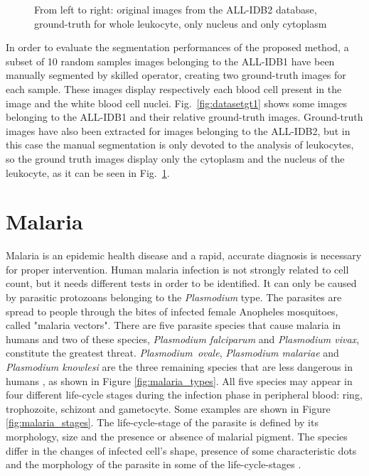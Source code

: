 \documentclass[final,a4paper,12pt,english]{UnicaPhdThesis3}
\begin{document}
	\begin{figure}[!htbp]
		\centering
		\hspace{12.5mm}
		\caption{\label{fig:datasetgt2}From left to right: original images from the ALL-IDB2 database, ground-truth for whole leukocyte, only nucleus and only cytoplasm}
	\end{figure}
	
	In order to evaluate the segmentation performances of the proposed method, a subset of 10 random samples images belonging to the ALL-IDB1 have been manually segmented by skilled operator, creating two ground-truth images for each sample. These images display respectively each blood cell present in the image and the white blood cell nuclei. Fig.~\ref{fig:datasetgt1} shows some images belonging to the ALL-IDB1 and their relative ground-truth images. Ground-truth images have also been extracted for images belonging to the ALL-IDB2, but in this case the manual segmentation is only devoted to the analysis of leukocytes, so the ground truth images display only the cytoplasm and the nucleus of the leukocyte, as it can be seen in Fig.~\ref{fig:datasetgt2}.
	
	\section{Malaria}
	Malaria is an epidemic health disease and a rapid, accurate diagnosis is necessary for proper intervention. 
	Human malaria infection is not strongly related to cell count, but it needs different tests in order to be identified. It can only be caused by parasitic protozoans belonging to the \emph{Plasmodium} type. The parasites are spread to people through the bites of infected female Anopheles mosquitoes, called "malaria vectors".
	There are five parasite species that cause malaria in humans and two of these species, \emph{Plasmodium falciparum} and \emph{Plasmodium vivax}, constitute the greatest threat. \emph{Plasmodium~ovale}, \emph{Plasmodium malariae} and \emph{Plasmodium knowlesi} are the three remaining species that are less dangerous in humans \cite{WHO_dec_2016}, as shown in Figure \ref{fig:malaria_types}.
	All five species may appear in four different life-cycle stages during the infection phase in peripheral blood: ring, trophozoite, schizont and gametocyte. Some examples are shown in Figure \ref{fig:malaria_stages}.
	The life-cycle-stage of the parasite is defined by its morphology, size and the presence or absence of malarial pigment.
	The species differ in the changes of infected cell's shape, presence of some characteristic dots and the morphology of the parasite in some of the life-cycle-stages \cite{Somasekar2011}.
	
\end{document}
